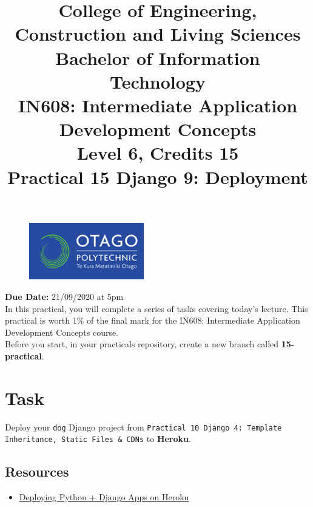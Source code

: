 \documentclass{article}
\author{}
\begin{document}
\begin{figure}
	\centering
	\includegraphics[width=50mm]{./img/logo.png}
\end{figure}

\title{College of Engineering, Construction and Living Sciences\\Bachelor of Information Technology\\IN608: Intermediate Application Development Concepts\\Level 6, Credits 15\\\textbf{Practical 15 Django 9: Deployment}} 
\date{}
\maketitle

\textbf{Due Date:} 21/09/2020 at 5pm \\

In this practical, you will complete a series of tasks covering today's lecture. This practical is worth 1\% of the final mark for the IN608: Intermediate Application Development Concepts course. \\

Before you start, in your practicals repository, create a new branch called \textbf{15-practical}.

\section*{Task} 
Deploy your \texttt{dog} Django project from \texttt{Practical 10 Django 4: Template Inheritance, Static Files \& CDNs} to \textbf{Heroku}.

\subsection*{Resources} 
\begin{itemize}
  \item \href{https://devcenter.heroku.com/articles/deploying-python}{Deploying Python + Django Apps on Heroku}
\end{itemize}
\end{document}

